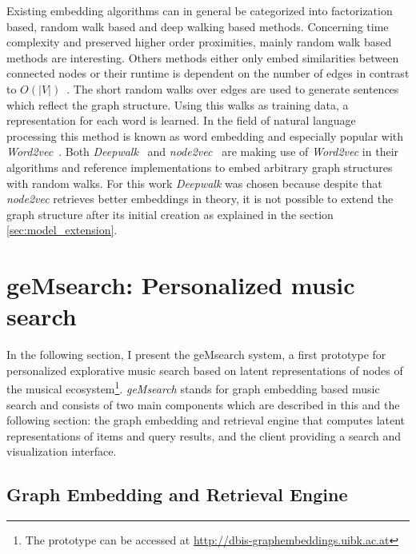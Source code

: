 \documentclass[sigconf]{acmart}
\begin{document}
Existing embedding algorithms can in general be categorized into factorization based, random walk based and deep walking based methods. Concerning time complexity and preserved higher order proximities, mainly random walk based methods are interesting. Others methods either only embed similarities between connected nodes or their runtime is dependent on the number of edges in contrast to $ O(|V|) $~\cite{goyal2017graph}. The short random walks over edges are used to generate sentences which reflect the graph structure. Using this walks as training data, a representation for each word is learned. In the field of natural language processing this method is known as word embedding and especially popular with \emph{Word2vec}~\cite{mikolov2013efficient}. Both \emph{Deepwalk}~\cite{perozzi2014deepwalk} and \emph{node2vec}~\cite{grover2016node2vec} are making use of \emph{Word2vec} in their algorithms and reference implementations to embed arbitrary graph structures with random walks. For this work \emph{Deepwalk} was chosen because despite that \emph{node2vec} retrieves better embeddings in theory, it is not possible to extend the graph structure after its initial creation as explained in the section \ref{sec:model_extension}.

\section{geMsearch: Personalized music search}
In the following section, I present the geMsearch system, a first prototype for personalized explorative music search based on latent representations of nodes of the musical ecosystem\footnote{The prototype can be accessed at \url{http://dbis-graphembeddings.uibk.ac.at}}.
\emph{geMsearch} stands for graph embedding based music search and consists of two main components which are described in this and the following section: the graph embedding and retrieval engine that computes latent representations of items and query results, and the client providing a search and visualization interface. 


\subsection{Graph Embedding and Retrieval Engine}



\end{document}
